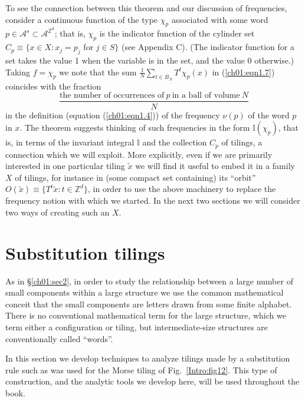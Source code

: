 \documentclass[reqno]{stml-l}
\theoremstyle{plain}
\theoremstyle{definition}
\numberwithin{equation}{chapter}
\begin{document}
To see the connection between this theorem and our discussion of frequencies, consider a continuous function of the type $\chi_{p}$ associated with some word $p\in \mathcal{A}^{s}\subset \mathcal{A}^{\mathbb{Z}^{d}}$; that is, $\chi_{p}$ is the indicator function of the cylinder set $C_{p}\equiv\{x\in X:x_{j}=p_{j}$ for $j\in S\}$ (see Appendix C). (The indicator function for a set takes the value 1 when the variable is in the set, and the value 0 otherwise.) Taking $f=\chi_{p}$ we note that the sum $\frac{1}{N}\sum\nolimits_{t\in B_{N}}T^{t}\chi_{p}(x)$ in (\ref{ch01:eqn1.7}) coincides with the fraction
\begin{equation}
\frac{\mbox{the number of occurrences of}\ p\ \mbox{in a ball of volume}\
N}{N} \label{ch01:eqn1.9}
\end{equation}
in the definition (equation (\ref{ch01:eqn1.4})) of the frequency $\nu(p)$ of the word $p$ in $x$. The theorem suggests thinking of such frequencies in the form $\mathbb{I}(\chi_{p})$, that is, in terms of the invariant integral
$\mathbb{I}$ and the collection $C_{p}$ of tilings, a connection which we will exploit. More explicitly, even if we are primarily interested in one particular tiling $\tilde{x}$ we will find it useful to embed it in a family $X$ of tilings, for instance in (some compact set containing) its ``orbit'' $O(\tilde{x})\equiv\{T^{t}\tilde{x}:t\in \mathbb{Z}^{d}\}$, in order to use the above machinery to replace the frequency notion with which we started. In the next two sections we will consider two ways of creating such an $X$.

\section{Substitution tilings}\label{ch01:sec3}

As in \S\ref{ch01:sec2}, in order to study the relationship between a large number of small components within a large structure we use the common mathematical conceit that the small components are letters drawn from some finite alphabet. There is no conventional mathematical term for the large structure, which we term either a configuration or tiling, but intermediate-size structures are conventionally called ``words''.

In this section we develop techniques to analyze tilings made by a substitution rule such as was used for the Morse tiling of Fig.~\ref{Intro:fig12}. This type of construction, and the analytic tools we develop here, will be used throughout the book.
\end{document}
